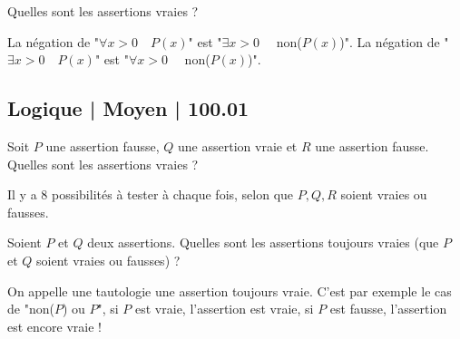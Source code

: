 \begin{question}
Quelles sont les assertions vraies ?
\begin{answers}



\end{answers}
\begin{explanations}
La négation de "$\forall x > 0 \quad P(x)$" est "$\exists x > 0 \quad$ non($P(x)$)".
La négation de "$\exists x > 0 \quad P(x)$" est "$\forall x > 0 \quad$ non($P(x)$)".
\end{explanations}
\end{question}

\subsection{Logique | Moyen | 100.01}


\begin{question}
Soit $P$ une assertion fausse, $Q$ une assertion vraie et $R$ une assertion fausse. Quelles sont les assertions vraies ?
\begin{answers}



\end{answers}
\begin{explanations}
Il y a 8 possibilités à tester à chaque fois, selon que $P,Q,R$ soient vraies ou fausses.
\end{explanations}
\end{question}


\begin{question}
Soient $P$ et $Q$ deux assertions. Quelles sont les assertions toujours vraies (que $P$ et $Q$ soient vraies ou fausses)  ?
\begin{answers}



\end{answers}
\begin{explanations}
On appelle une tautologie une assertion toujours vraie. C'est par exemple le cas de "non($P$) ou $P$", si $P$ est vraie, l'assertion est vraie, si $P$ est fausse, l'assertion est encore vraie !
\end{explanations}
\end{question}


